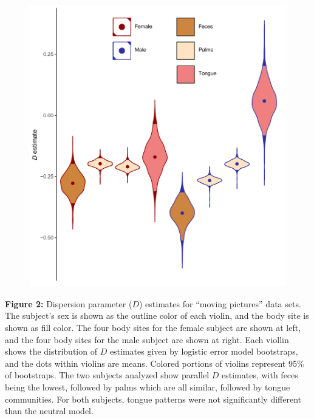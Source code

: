 \documentclass{article}
\begin{document}
{\begin{figure}[t]
	\centering
	\includegraphics[scale=0.80]{figs/Fig_2.pdf}
\end{figure}
\textbf{Figure 2:}\label{sec:figure2} Dispersion parameter (\(D\)) estimates for “moving pictures” \cite{Caporaso2011} data sets. The subject’s sex is shown as the outline color of each violin, and the body site is shown as fill color. The four body sites for the female subject are shown at left, and the four body sites for the male subject are shown at right. Each viollin shows the distribution of \(D\) estimates given by logistic error model bootstraps, and the dots within violins are means. Colored portions of violins represent 95\% of bootstraps. The two subjects analyzed show parallel \(D\) estimates, with feces being the lowest, followed by palms which are all similar, followed by tongue communities. For both subjects, tongue patterns were not significantly different than the neutral model.
\newpage

}
\end{document}
